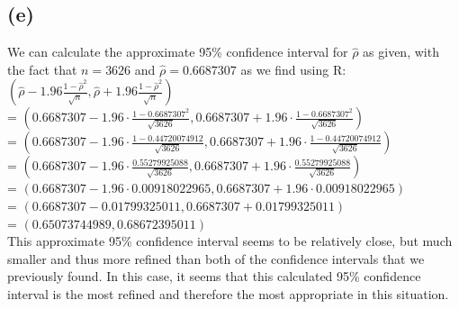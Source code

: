 \documentclass{article}
\begin{document}
{\subsection*{(e)}

We can calculate the approximate 95\% confidence interval for $\hat{\rho}$ as given, with the fact that $n = 3626$ and $\hat{\rho} = 0.6687307$ as we find using R: \\
$(\hat{\rho} - 1.96 \frac{1 - \hat{\rho}^2}{\sqrt{n}}, \hat{\rho} + 1.96 \frac{1 - \hat{\rho}^2}{\sqrt{n}})$ \\
= $(0.6687307 - 1.96 \cdot \frac{1 - 0.6687307^2}{\sqrt{3626}}, 0.6687307 + 1.96 \cdot \frac{1 - 0.6687307^2}{\sqrt{3626}})$ \\
= $(0.6687307 - 1.96 \cdot \frac{1 - 0.44720074912}{\sqrt{3626}}, 0.6687307 + 1.96 \cdot \frac{1 - 0.44720074912}{\sqrt{3626}})$ \\
= $(0.6687307 - 1.96 \cdot \frac{0.55279925088}{\sqrt{3626}}, 0.6687307 + 1.96 \cdot \frac{0.55279925088}{\sqrt{3626}})$ \\
= $(0.6687307 - 1.96 \cdot 0.00918022965, 0.6687307 + 1.96 \cdot 0.00918022965)$ \\
= $(0.6687307 - 0.01799325011, 0.6687307 + 0.01799325011)$ \\
= $(0.65073744989, 0.68672395011)$ \\
This approximate 95\% confidence interval seems to be relatively close, but much smaller and thus more refined than both of the confidence intervals that we previously found. In this case, it seems that this calculated 95\% confidence interval is the most refined and therefore the most appropriate in this situation.
\newpage

}
\end{document}
